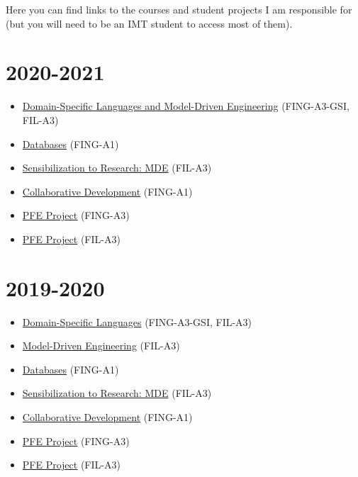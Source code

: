 Here you can find links to the courses and student projects I am
responsible for (but you will need to be an IMT student to access most
of them).

\hypertarget{section}{%
\section{2020-2021}\label{section}}

\begin{itemize}
\tightlist
\item
  \href{https://moodle.imt-atlantique.fr/course/view.php?id=313}{Domain-Specific
  Languages and Model-Driven Engineering} (FING-A3-GSI, FIL-A3)
\item
  \href{https://formations.imt-atlantique.fr/bd_ihm}{Databases}
  (FING-A1)
\item
  \href{https://moodle.imt-atlantique.fr/course/view.php?id=299}{Sensibilization
  to Research: MDE} (FIL-A3)
\item
  \href{https://moodle.imt-atlantique.fr/course/view.php?id=16}{Collaborative
  Development} (FING-A1)
\item
  \href{https://moodle.imt-atlantique.fr/course/view.php?id=314}{PFE
  Project} (FING-A3)
\item
  \href{https://moodle.imt-atlantique.fr/course/view.php?id=314}{PFE
  Project} (FIL-A3)
\end{itemize}

\hypertarget{section-1}{%
\section{2019-2020}\label{section-1}}

\begin{itemize}
\tightlist
\item
  \href{https://moodle.imt-atlantique.fr/course/view.php?id=313}{Domain-Specific
  Languages} (FING-A3-GSI, FIL-A3)
\item
  \href{https://moodle.imt-atlantique.fr/course/view.php?id=668}{Model-Driven
  Engineering} (FIL-A3)
\item
  \href{https://formations.imt-atlantique.fr/bd_ihm}{Databases}
  (FING-A1)
\item
  \href{https://moodle.imt-atlantique.fr/course/view.php?id=299}{Sensibilization
  to Research: MDE} (FIL-A3)
\item
  \href{https://moodle.imt-atlantique.fr/course/view.php?id=16}{Collaborative
  Development} (FING-A1)
\item
  \href{https://moodle.imt-atlantique.fr/course/view.php?id=314}{PFE
  Project} (FING-A3)
\item
  \href{https://moodle.imt-atlantique.fr/course/view.php?id=314}{PFE
  Project} (FIL-A3)
\end{itemize}

